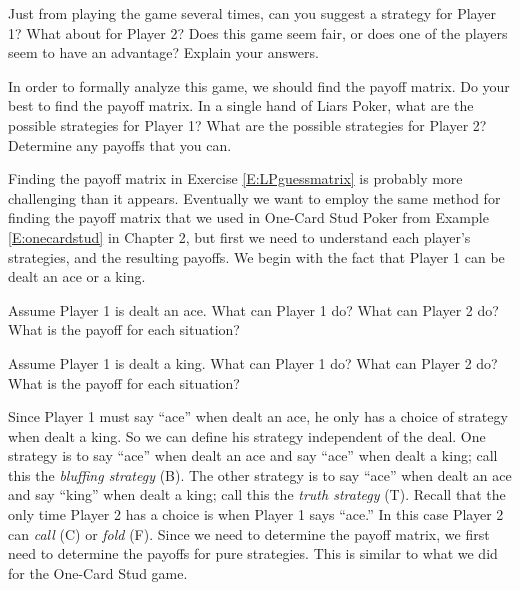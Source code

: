 \begin{xca}\label{E:LPguessstrat} 
Just from playing the game several times, can you suggest a strategy for Player 1? What about for Player 2? Does this game seem fair, or does one of the players seem to have an advantage? Explain your answers.
\end{xca}


\begin{xca}\label{E:LPguessmatrix} 
In order to formally analyze this game, we should find the payoff matrix. Do your best to find the payoff matrix. In a single hand of Liars Poker, what are the possible strategies for Player 1? What are the possible strategies for Player 2? Determine any payoffs that you can.
\end{xca}


Finding the payoff matrix in Exercise \ref{E:LPguessmatrix} is probably more challenging than it appears. Eventually we want to employ the same method for finding the payoff matrix that we used in One-Card Stud Poker from Example \ref{E:onecardstud} in Chapter 2, but first we need to understand each player's strategies, and the resulting payoffs.  We begin with the fact that Player 1 can be dealt an ace or a king. 

\begin{xca}\label{E:LPP1Ace}
Assume Player 1 is dealt an ace. What can Player 1 do? What can Player 2 do? What is the payoff for each situation?
\end{xca}

\begin{xca}\label{E:LPP1King}
Assume Player 1 is dealt a king. What can Player 1 do? What can Player 2 do? What is the payoff for each situation?
\end{xca}



Since Player 1 must say ``ace'' when dealt an ace, he only has a choice of strategy when dealt a king. So we can define his strategy independent of the deal. One strategy is to say ``ace'' when dealt an ace and say ``ace'' when dealt a king; call this the \emph{bluffing strategy} (B). The other strategy is to say ``ace'' when dealt an ace and say ``king'' when dealt a king; call this the \emph{truth strategy} (T). Recall that the only time Player 2 has a choice is when Player 1 says ``ace.'' In this case Player 2 can \emph{call} (C) or \emph{fold} (F). Since we need to determine the payoff matrix, we first need to determine  the payoffs for pure strategies. This is similar to what we did for the One-Card Stud game.

